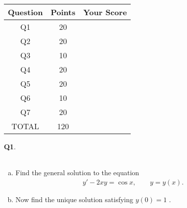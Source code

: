 \documentclass[12pt, oneside]{amsart}
\newcommand{\one}{20}
\newcommand{\two}{20}
\newcommand{\three}{10}
\newcommand{\four}{20}
\newcommand{\five}{20}
\newcommand{\six}{10}
\newcommand{\seven}{20}
\begin{document}
\begin{center}
    {\large
        \begin{tabular}{|c|c|c|}
            \hline
            \rule[-0.3cm]{0cm}{1cm}
            \textsf{Question} & \textsf{Points} &  \textsf{Your Score} \\
            \hline
            \hline
            \rule[-0.3cm]{0cm}{1cm}
            \textsf{Q1} & \one &\\
            \hline
            \rule[-0.3cm]{0cm}{1cm}
            \textsf{Q2} & \two &\\
            \hline
            \rule[-0.3cm]{0cm}{1cm}
            \textsf{Q3} & \three &\\
            \hline
            \rule[-0.3cm]{0cm}{1cm}
            \textsf{Q4} & \four &\\
            \hline
            \rule[-0.3cm]{0cm}{1cm}
            \textsf{Q5} & \five &\\
            \hline
            \rule[-0.3cm]{0cm}{1cm}
            \textsf{Q6} & \six &\\
            \hline
                        \rule[-0.3cm]{0cm}{1cm}
            \textsf{Q7} & \seven &\\
            \hline
            \rule[-0.3cm]{0cm}{1cm}
            \textsf{TOTAL} & 120 & \\
            \hline
        \end{tabular}
    } 

\end{center}

\vfill


\newpage
\noindent
\textbf{Q1}. \\ \\ 
\begin{enumerate}[a)]
    \item
Find the general solution to the equation
\begin{equation*}
\begin{split}
y' - 2xy = \cos x, \qquad y = y(x).
\end{split}
\end{equation*}


\vspace{5in}
\item
    Now find the unique solution satisfying $y(0) = 1$ .
\end{enumerate}
\end{document}
